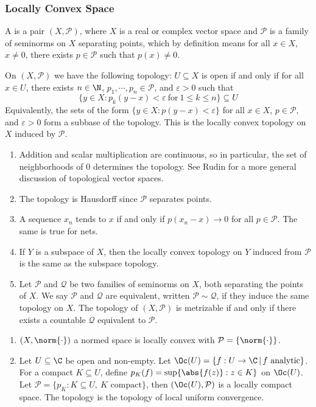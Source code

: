 \documentclass[a4paper]{article}
\begin{document}
\subsubsection*{Locally Convex Space}
{\renewcommand{\P}{\mathcal{P}}
A  is a pair $(X,\P)$, where $X$ is a real or complex vector space and $\P$ is a family of seminorms on $X$ separating points, which by definition means for all $x\in X$, $x\not= 0$, there exists $p\in\P$ such that $p(x)\not= 0$.

On $(X,\P)$ we have the following topology: $U\subseteq X$ is open if and only if for all $x\in U$, there exists $n\in\N$, $p_1,\cdots,p_n\in\P$, and $\varepsilon>0$ such that
\[
  \{y\in X:p_k(y-x)<\varepsilon\ \mathrm{for}\ 1\leq k\leq n\}\subseteq U
\]
Equivalently, the sets of the form $\{y\in X:p(y-x)<\varepsilon\}$ for all $x\in X$, $p\in\P$, and $\varepsilon>0$ form a subbase of the topology. This is the locally convex topology on $X$ induced by $\P$.

\begin{remark}
	\begin{enumerate}[label=(\arabic*)]
		\item Addition and scalar multiplication are continuous, so in particular, the set of neighborhoods of 0 determines the topology. See Rudin for a more general discussion of topological vector spaces.
		\item The topology is Hausdorff since $\P$ separates points.
		\item A sequence $x_n$ tends to $x$ if and only if $p(x_n-x)\to 0$ for all $p\in\P$. The same is true for nets.
		\item If $Y$ is a subspace of $X$, then the locally convex topology on $Y$ induced from $\P$ is the same as the subspace topology.
		\item Let $\P$ and $\mathcal{Q}$ be two families of seminorms on $X$, both separating the points of $X$. We say $\P$ and $\mathcal{Q}$ are equivalent, written $\P\sim\mathcal{Q}$, if they induce the same topology on $X$. The topology of $(X,\P)$ is metrizable if and only if there exists a countable $\mathcal{Q}$ equivalent to $\P$.
	\end{enumerate}
\end{remark}

\begin{eg}
	\begin{enumerate}[label=(\arabic*)]
		\item $(X,\norm{\cdot})$ a normed space is locally convex with $\P=\{\norm{\cdot}\}$.
		\item Let $U\subseteq\C$ be open and non-empty. Let $\Oc(U)=\{f:U\to\C\,|\,f\text{ analytic}\}$. For a compact $K\subseteq U$, define $p_K(f)=\sup\{\abs{f(z)}:z\in K\}$ on $\Oc(U)$. Let $\P=\{p_K:K\subseteq U,\ K\text{ compact}\}$, then $(\Oc(U),\P)$ is a locally compact space. The topology is the topology of local uniform convergence.


\end{enumerate}
\end{eg}}
\end{document}
